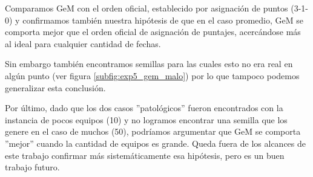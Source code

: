\par Comparamos GeM con el orden oficial, establecido por asignación de puntos
(3-1-0) y confirmamos tambi\'en nuestra hip\'otesis de que en el caso promedio,
GeM se comporta mejor que el orden oficial de asignaci\'on de puntajes,
acerc\'andose más al ideal para cualquier cantidad de fechas.

\par Sin embargo tambi\'en encontramos semillas para las cuales esto no era real
en alg\'un punto (ver figura \ref{subfig:exp5_gem_malo}) por lo que tampoco
podemos generalizar esta conclusi\'on.

\par Por \'ultimo, dado que los dos casos ''patol\'ogicos'' fueron encontrados
con la instancia de pocos equipos (10) y no logramos encontrar una semilla que
los genere en el caso de muchos (50), podr\'iamos argumentar que GeM se comporta
''mejor'' cuando la cantidad de equipos es grande. Queda fuera de los alcances
de este trabajo confirmar m\'as sistem\'aticamente esa hip\'otesis, pero es un
buen trabajo futuro.
